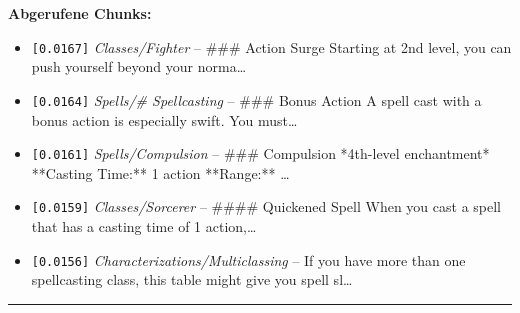 \noindent\textbf{Abgerufene Chunks:}
\begin{itemize}[noitemsep, topsep=2pt]
  \item[\textbf{\#1}] \texttt{[0.0167]} \textit{Classes/Fighter} -- \#\#\# Action Surge  Starting at 2nd level, you can push yourself beyond your norma\ldots
  \item[\textbf{\#2}] \texttt{[0.0164]} \textit{Spells/# Spellcasting} -- \#\#\# Bonus Action  A spell cast with a bonus action is especially swift. You must\ldots
  \item[\textbf{\#3}] \texttt{[0.0161]} \textit{Spells/Compulsion} -- \#\#\# Compulsion  *4th-level enchantment*  **Casting Time:** 1 action  **Range:** \ldots
  \item[\textbf{\#4}] \texttt{[0.0159]} \textit{Classes/Sorcerer} -- \#\#\#\# Quickened Spell  When you cast a spell that has a casting time of 1 action,\ldots
  \item[\textbf{\#5}] \texttt{[0.0156]} \textit{Characterizations/Multiclassing} -- If you have more than one spellcasting class, this table might give you spell sl\ldots
\end{itemize}
\vspace{4pt}
\hrule
\vspace{6pt}

